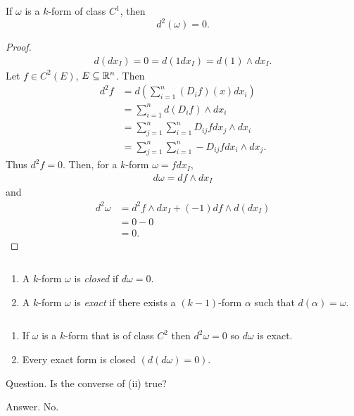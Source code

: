 \documentclass[11pt]{article}
\begin{document}
\begin{theorem} If $\omega$ is a $k$-form of class $C^1$, then $$d^2(\omega) = 0.$$
\end{theorem}
\begin{proof} \begin{align*} d (dx_I) = 0 = d(1 dx_I) = d(1) \wedge dx_I.
\end{align*} Let $f \in C^2(E)$, $E \subseteq \mathbb{R}^n$. Then \begin{align*} d^2 f & = d \left( \sum_{i = 1}^n (D_i f)(x) dx_i \right) \\ & = \sum_{i = 1}^n d(D_i f) \wedge dx_i \\ & = \sum_{j = 1}^n \sum_{i = 1}^n D_{ij} f dx_j \wedge dx_i \\ & = \sum_{j = 1}^n \sum_{i = 1}^n -D_{ij} f dx_i \wedge dx_j.
\end{align*} Thus $d^2 f = 0$.
Then, for a $k$-form $\omega = f dx_I$, \begin{align*} d \omega = df \wedge dx_I
\end{align*} and \begin{align*} d^2 \omega & = d^2 f \wedge dx_I + (-1) df \wedge d (dx_I) \\ & = 0 - 0 \\ & = 0.
\end{align*}
\end{proof}

\begin{definition} $\text{}$
  \begin{enumerate}
  \item A $k$-form $\omega$ is \emph{closed} if $d \omega = 0$.
    \item A $k$-form $\omega$ is \emph{exact} if there exists a $(k - 1)$-form $\alpha$ such that $d(\alpha) = \omega$. 
  \end{enumerate}
\end{definition}

\begin{remark} $\text{}$
  \begin{enumerate}
  \item If $\omega$ is a $k$-form that is of class $C^2$ then $d^2 \omega = 0$ so $d \omega$ is exact.
    \item Every exact form is closed $(d (d\omega) = 0)$.
  \end{enumerate}
\end{remark}

Question. Is the converse of (ii) true?

Answer. No. 
\end{document}
